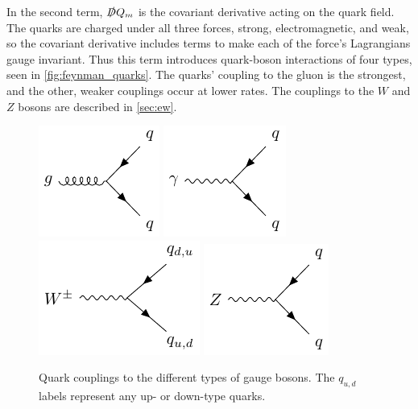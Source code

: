 In the second term, $\slashed{D} Q_m$ is the covariant derivative acting on the quark field. The quarks are charged under all three forces, strong, electromagnetic, and weak, so the covariant derivative includes terms to make each of the force's Lagrangians gauge invariant. Thus this term introduces quark-boson interactions of four types, seen in \autoref{fig:feynman_quarks}. The quarks' coupling to the gluon is the strongest, and the other, weaker couplings occur at lower rates. The couplings to the $W$ and $Z$ bosons are described in \autoref{sec:ew}.

\begin{centering}
\begin{figure}[!hbt]
\myfloatalign
\includegraphics[width=.45\linewidth]{feynman/quark_strong.pdf}
\includegraphics[width=.45\linewidth]{feynman/quark_em.pdf}
\includegraphics[width=.48\linewidth]{feynman/quark_w.pdf}
\includegraphics[width=.45\linewidth]{feynman/quark_z.pdf}
\caption{Quark couplings to the different types of gauge bosons. The $q_{u,d}$ labels represent any up- or down-type quarks.}
\label{fig:feynman_quarks}
\end{figure}
\end{centering}

